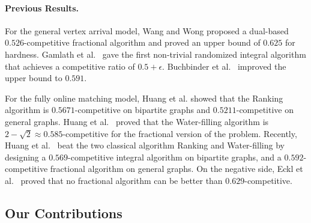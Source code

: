 \paragraph{Previous Results.} For the general vertex arrival model, Wang and Wong proposed a dual-based $0.526$-competitive fractional algorithm and proved an upper bound of $0.625$ for hardness. Gamlath et al.~\cite{focs/GamlathKMSW19} gave the first non-trivial randomized integral algorithm that achieves a competitive ratio of $0.5+\epsilon$. Buchbinder et al.~\cite{algorithmica/BuchbinderST19} improved the upper bound to $0.591$. 

For the fully online matching model, Huang et al. \cite{jacm/HuangKTWZZ20} showed that the Ranking algorithm is $0.5671$-competitive on bipartite graphs and $0.5211$-competitive on general graphs. Huang et al.~\cite{soda/HuangPTTWZ19} proved that the Water-filling algorithm is $2-\sqrt{2} \approx 0.585$-competitive for the fractional version of the problem. Recently, Huang et al.~\cite{focs/HuangTWZ20} beat the two classical algorithm Ranking and Water-filling by designing a $0.569$-competitive integral algorithm on bipartite graphs, and a $0.592$-competitive fractional algorithm on general graphs. On the negative side, Eckl et al.~\cite{orl/EcklKLS21} proved that no fractional algorithm can be better than $0.629$-competitive.


\subsection{Our Contributions}


